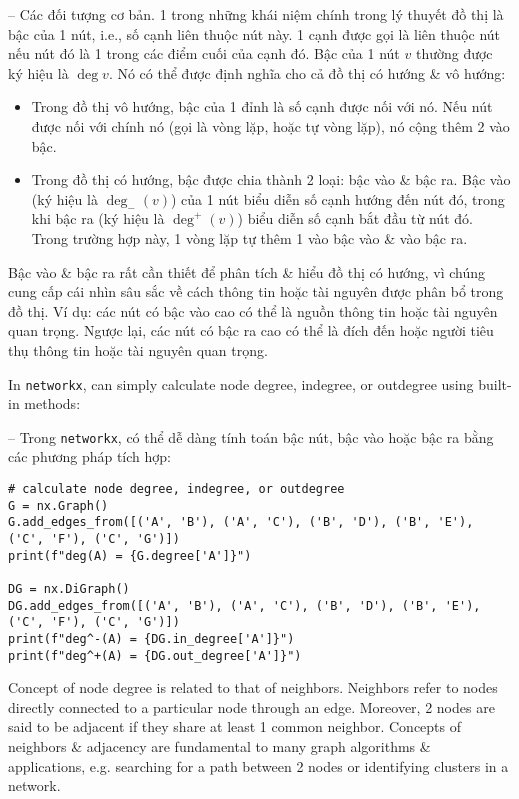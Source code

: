 \documentclass{article}
\begin{document}
\begin{itemize}
\begin{itemize}
\begin{itemize}
            -- {\sf Các đối tượng cơ bản.} 1 trong những khái niệm chính trong lý thuyết đồ thị là bậc của 1 nút, i.e., số cạnh liên thuộc nút này. 1 cạnh được gọi là liên thuộc nút nếu nút đó là 1 trong các điểm cuối của cạnh đó. Bậc của 1 nút $v$ thường được ký hiệu là $\deg v$. Nó có thể được định nghĩa cho cả đồ thị có hướng \& vô hướng:
            \begin{itemize}
                \item Trong đồ thị vô hướng, bậc của 1 đỉnh là số cạnh được nối với nó. Nếu nút được nối với chính nó (gọi là vòng lặp, hoặc tự vòng lặp), nó cộng thêm 2 vào bậc.
                \item Trong đồ thị có hướng, bậc được chia thành 2 loại: bậc vào \& bậc ra. Bậc vào (ký hiệu là $\deg_-(v)$) của 1 nút biểu diễn số cạnh hướng đến nút đó, trong khi bậc ra (ký hiệu là $\deg^+(v)$) biểu diễn số cạnh bắt đầu từ nút đó. Trong trường hợp này, 1 vòng lặp tự thêm 1 vào bậc vào \& vào bậc ra.
            \end{itemize}
            Bậc vào \& bậc ra rất cần thiết để phân tích \& hiểu đồ thị có hướng, vì chúng cung cấp cái nhìn sâu sắc về cách thông tin hoặc tài nguyên được phân bổ trong đồ thị. Ví dụ: các nút có bậc vào cao có thể là nguồn thông tin hoặc tài nguyên quan trọng. Ngược lại, các nút có bậc ra cao có thể là đích đến hoặc người tiêu thụ thông tin hoặc tài nguyên quan trọng.

            In {\tt networkx}, can simply calculate node degree, indegree, or outdegree using built-in methods:

            -- Trong {\tt networkx}, có thể dễ dàng tính toán bậc nút, bậc vào hoặc bậc ra bằng các phương pháp tích hợp:
            \begin{verbatim}
# calculate node degree, indegree, or outdegree
G = nx.Graph()
G.add_edges_from([('A', 'B'), ('A', 'C'), ('B', 'D'), ('B', 'E'), ('C', 'F'), ('C', 'G')])
print(f"deg(A) = {G.degree['A']}")

DG = nx.DiGraph()
DG.add_edges_from([('A', 'B'), ('A', 'C'), ('B', 'D'), ('B', 'E'), ('C', 'F'), ('C', 'G')])
print(f"deg^-(A) = {DG.in_degree['A']}")
print(f"deg^+(A) = {DG.out_degree['A']}")
            \end{verbatim}
            Concept of node degree is related to that of neighbors. Neighbors refer to nodes directly connected to a particular node through an edge. Moreover, 2 nodes are said to be adjacent if they share at least 1 common neighbor. Concepts of neighbors \& adjacency are fundamental to many graph algorithms \& applications, e.g. searching for a path between 2 nodes or identifying clusters in a network.


\end{itemize}
\end{itemize}
\end{itemize}
\end{document}
